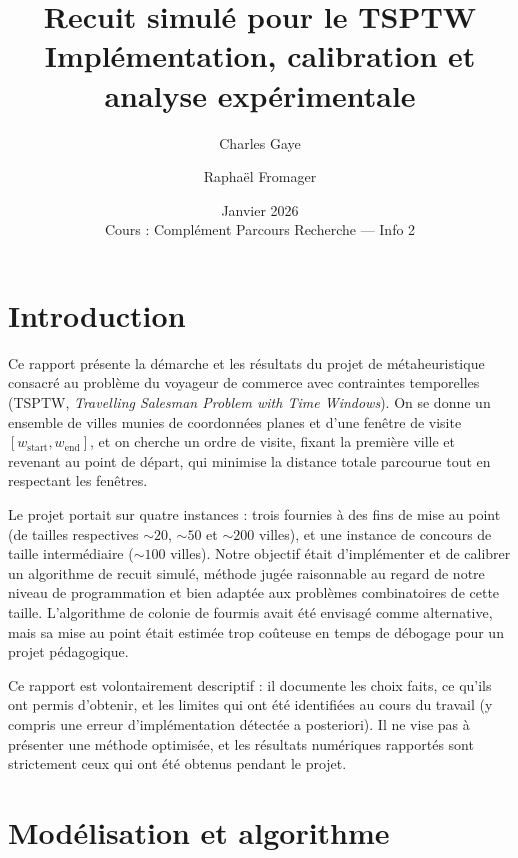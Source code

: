 \documentclass[11pt,a4paper]{article}
\title{\textbf{Recuit simulé pour le TSPTW}\\[6pt]
       \large Implémentation, calibration et analyse expérimentale}
\author{Charles Gaye \and Raphaël Fromager}
\date{Janvier 2026 \\ \small Cours : Complément Parcours Recherche — Info 2}
\begin{document}
\maketitle
\thispagestyle{empty}
\vspace{1cm}

\tableofcontents
\newpage

\section{Introduction}

Ce rapport présente la démarche et les résultats du projet de métaheuristique consacré
au problème du voyageur de commerce avec contraintes temporelles
(\textsc{TSPTW}, \emph{Travelling Salesman Problem with Time Windows}). On se donne un
ensemble de villes munies de coordonnées planes et d'une fenêtre de visite
$[w_{\text{start}}, w_{\text{end}}]$, et on cherche un ordre de visite, fixant la première
ville et revenant au point de départ, qui minimise la distance totale parcourue tout en
respectant les fenêtres.

Le projet portait sur quatre instances : trois fournies à des fins de mise au point
(de tailles respectives ${\sim}20$, ${\sim}50$ et ${\sim}200$ villes), et une instance
de concours de taille intermédiaire (${\sim}100$ villes). Notre objectif était
d'implémenter et de calibrer un algorithme de recuit simulé, méthode jugée
raisonnable au regard de notre niveau de programmation et bien adaptée aux problèmes
combinatoires de cette taille. L'algorithme de colonie de fourmis avait été envisagé
comme alternative, mais sa mise au point était estimée trop coûteuse en temps de
débogage pour un projet pédagogique.

Ce rapport est volontairement descriptif : il documente les choix faits, ce qu'ils
ont permis d'obtenir, et les limites qui ont été identifiées au cours du travail
(y compris une erreur d'implémentation détectée a posteriori). Il ne vise pas à
présenter une méthode optimisée, et les résultats numériques rapportés sont strictement
ceux qui ont été obtenus pendant le projet.

\section{Modélisation et algorithme}
\end{document}
